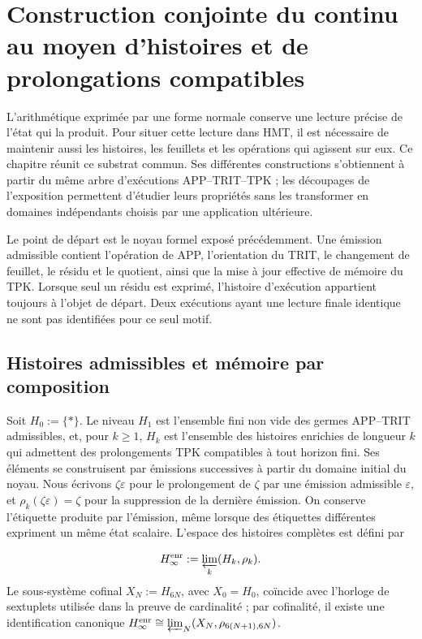 \section{Construction conjointe du continu au moyen d'histoires et de prolongations compatibles}
\label{act21:iv:continuo-conjunto}
L’arithmétique exprimée par une forme normale conserve une lecture précise de l’état qui la produit. Pour situer cette lecture dans HMT, il est nécessaire de maintenir aussi les histoires, les feuillets et les opérations qui agissent sur eux. Ce chapitre réunit ce substrat commun. Ses différentes constructions s’obtiennent à partir du même arbre d’exécutions APP–TRIT–TPK ; les découpages de l’exposition permettent d’étudier leurs propriétés sans les transformer en domaines indépendants choisis par une application ultérieure.

Le point de départ est le noyau formel exposé précédemment. Une émission admissible contient l’opération de APP, l’orientation du TRIT, le changement de feuillet, le résidu et le quotient, ainsi que la mise à jour effective de mémoire du TPK. Lorsque seul un résidu est exprimé, l’histoire d’exécution appartient toujours à l’objet de départ. Deux exécutions ayant une lecture finale identique ne sont pas identifiées pour ce seul motif.

\subsection{Histoires admissibles et mémoire par composition}
Soit \(H_0:=\{\ast\}\). Le niveau \(H_1\) est l’ensemble fini non vide des
germes APP--TRIT admissibles, et, pour \(k\geq1\), \(H_k\) est l’ensemble des
histoires enrichies de longueur \(k\) qui admettent des prolongements TPK
compatibles à tout horizon fini. Ses éléments se construisent par émissions
successives à partir du domaine initial du noyau. Nous écrivons \(\zeta\varepsilon\)
pour le prolongement de \(\zeta\) par une émission admissible \(\varepsilon\), et
\(\rho_k(\zeta\varepsilon)=\zeta\) pour la suppression de la dernière émission. On
conserve l’étiquette produite par l’émission, même lorsque des étiquettes
différentes expriment un même état scalaire. L’espace des histoires complètes
est défini par

\[
 H_\infty^{\rm enr}:=\varprojlim_k(H_k,\rho_k).
\]
Le sous-système cofinal \(X_N:=H_{6N}\), avec \(X_0=H_0\), coïncide avec l'horloge
de sextuplets utilisée dans la preuve de cardinalité ; par cofinalité, il existe une
identification canonique
\(H_\infty^{\rm enr}\cong\varprojlim_N(X_N,\rho_{6(N+1),6N})\).

